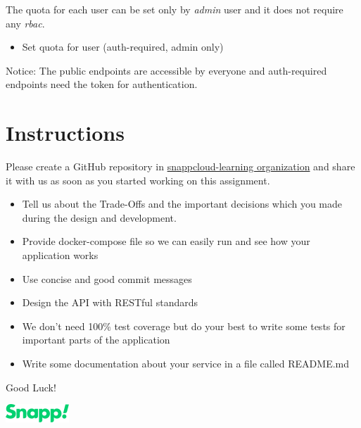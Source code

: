 \documentclass{article}
\begin{document}
The quota for each user can be set only by \textit{admin} user and it does not require any \textit{rbac}.

\begin{itemize}
  \item Set quota for user (auth-required, admin only)
\end{itemize}


Notice: The public endpoints are accessible by everyone and auth-required endpoints need the token for authentication.

\section{Instructions}

Please create a GitHub repository in \href{https://github.com/orgs/snappcloud-learning/repositories}{snappcloud-learning organization} and share it
with us as soon as you started working on this assignment.

\begin{itemize}
  \item Tell us about the Trade-Offs and the important decisions which you made during the design and development.
  \item Provide docker-compose file so we can easily run and see how your application works
  \item Use concise and good commit messages
  \item Design the API with RESTful standards
  \item We don’t need 100\% test coverage but do your best to write some tests for important parts of the application
  \item Write some documentation about your service in a file called README.md
\end{itemize}

Good Luck!

\vspace{1cm}
\includegraphics[width=.25\textwidth]{./snapp.png}
\end{document}
